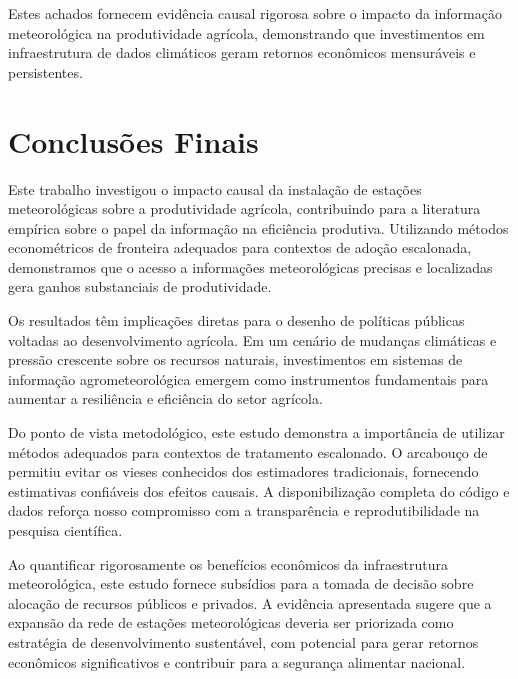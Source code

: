 \documentclass[
	12pt,				%
	oneside,			%
	a4paper,			%
	english,			%
	french,				%
	spanish,			%
	brazil				%
	]{abntex2}
\begin{document}
Estes achados fornecem evidência causal rigorosa sobre o impacto da informação meteorológica na produtividade agrícola, demonstrando que investimentos em infraestrutura de dados climáticos geram retornos econômicos mensuráveis e persistentes.

\chapter{Conclusões Finais}

Este trabalho investigou o impacto causal da instalação de estações meteorológicas sobre a produtividade agrícola, contribuindo para a literatura empírica sobre o papel da informação na eficiência produtiva. Utilizando métodos econométricos de fronteira adequados para contextos de adoção escalonada, demonstramos que o acesso a informações meteorológicas precisas e localizadas gera ganhos substanciais de produtividade.

Os resultados têm implicações diretas para o desenho de políticas públicas voltadas ao desenvolvimento agrícola. Em um cenário de mudanças climáticas e pressão crescente sobre os recursos naturais, investimentos em sistemas de informação agrometeorológica emergem como instrumentos fundamentais para aumentar a resiliência e eficiência do setor agrícola.

Do ponto de vista metodológico, este estudo demonstra a importância de utilizar métodos adequados para contextos de tratamento escalonado. O arcabouço de  permitiu evitar os vieses conhecidos dos estimadores tradicionais, fornecendo estimativas confiáveis dos efeitos causais. A disponibilização completa do código e dados reforça nosso compromisso com a transparência e reprodutibilidade na pesquisa científica.

Ao quantificar rigorosamente os benefícios econômicos da infraestrutura meteorológica, este estudo fornece subsídios para a tomada de decisão sobre alocação de recursos públicos e privados. A evidência apresentada sugere que a expansão da rede de estações meteorológicas deveria ser priorizada como estratégia de desenvolvimento sustentável, com potencial para gerar retornos econômicos significativos e contribuir para a segurança alimentar nacional.

\postextual
\end{document}
